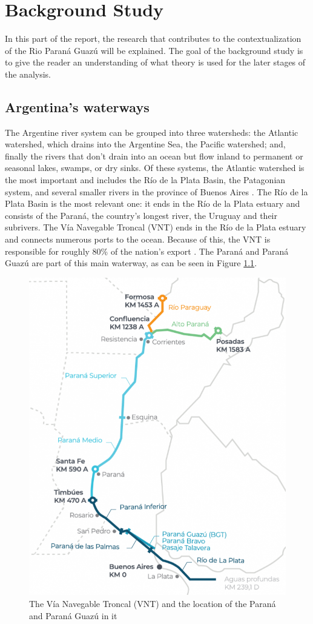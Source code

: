 \chapter{Background Study}
\label{chapter:background}
In this part of the report, the research that contributes to the contextualization of the Rio Paraná Guazú will be explained. The goal of the background study is to give the reader an understanding of what theory is used for the later stages of the analysis.

\section{Argentina's waterways}
The Argentine river system can be grouped into three watersheds: the Atlantic watershed, which drains into the Argentine Sea, the Pacific watershed; and, finally the rivers that don't drain into an ocean but flow inland to permanent or seasonal lakes, swamps, or dry sinks. Of these systems, the Atlantic watershed is the most important and includes the Río de la Plata Basin, the Patagonian system, and several smaller rivers in the province of Buenos Aires \autocite{farberHydrographyArgentina2024}. The Río de la Plata Basin is the most relevant one: it ends in the Río de la Plata estuary and consists of the Paraná, the country's longest river, the Uruguay and their subrivers. The Vía Navegable Troncal (VNT) ends in the Río de la Plata estuary and connects numerous ports to the ocean. Because of this, the VNT is responsible for roughly 80\% of the nation's export \autocite{agencianacionaldepuertosynavegacionNavegableTroncal2025}. The Paraná and Paraná Guazú are part of this main waterway, as can be seen in Figure \ref{fig:VNT}.

\begin{figure}[H]
    \centering
    \includegraphics[width=0.5\linewidth]{figures/ch2/2025_mapa_vnt_extendida_tramos_profundidades_abril.png}
    \caption{The Vía Navegable Troncal (VNT) and the location of the Paraná and Paraná Guazú in it \autocite{agencianacionaldepuertosynavegacionNavegableTroncal2025}}
    \label{fig:VNT}
\end{figure}

